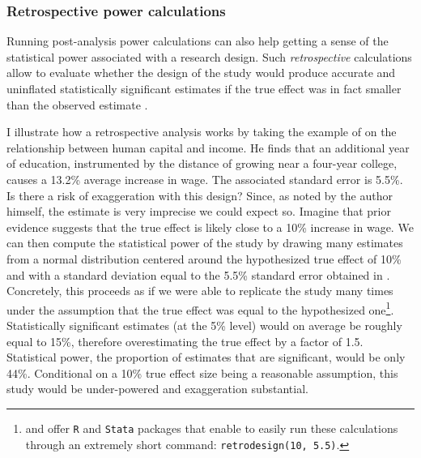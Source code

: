 \documentclass[usletter, 12pt]{article}
\begin{document}
				
			\subsubsection{Retrospective power calculations}
			
				Running post-analysis power calculations can also help getting a sense of the statistical power associated with a research design. Such \textit{retrospective} calculations allow to evaluate whether the design of the study would produce accurate and uninflated statistically significant estimates if the true effect was in fact smaller than the observed estimate \citep{gelman_beyond_2014, ioannidis_power_2017, stommes_reliability_2021}. 
				
				I illustrate how a retrospective analysis works by taking the example of \cite{card_using_1993} on the relationship between human capital and income. He finds that an additional year of education, instrumented by the distance of growing near a four-year college, causes a 13.2\% average increase in wage. The associated standard error is 5.5\%. Is there a risk of exaggeration with this design? Since, as noted by the author himself, the estimate is very imprecise we could expect so. Imagine that prior evidence suggests that the true effect is likely close to a 10\% increase in wage. We can then compute the statistical power of the study by drawing many estimates from a normal distribution centered around the hypothesized true effect of 10\% and with a standard deviation equal to the 5.5\% standard error obtained in \cite{card_using_1993}. Concretely, this proceeds as if we were able to replicate the study many times under the assumption that the true effect was equal to the hypothesized one\footnote{\cite{timm_retrodesign_2019} and \cite{linden_retrodesign_2019} offer \texttt{R} and \texttt{Stata} packages that enable to easily run these calculations through an extremely short command: \texttt{retrodesign(10, 5.5)}.}. Statistically significant estimates (at the 5\% level) would on average be roughly equal to 15\%, therefore overestimating the true effect by a factor of 1.5. Statistical power, the proportion of estimates that are significant, would be only 44\%. Conditional on a 10\% true effect size being a reasonable assumption, this study would be under-powered and exaggeration substantial.
			
\end{document}
